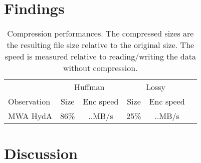 \documentclass{article}
\begin{document}
\section{Findings}

\begin{table}
 \caption{Compression performances. The compressed sizes are the resulting file size relative to the original size. The speed is measured relative to reading/writing the data without compression.}
 \begin{tabular}{|l|c|c|c|c|c|}
  \hline
   & \multicolumn{2}{|c|}{Huffman} & \multicolumn{2}{|c|}{Lossy} \\
  Observation &  \multicolumn{1}{|c}{Size} & \multicolumn{1}{c|}{Enc speed} & \multicolumn{1}{|c}{Size}&\multicolumn{1}{c|}{Enc speed} \\
  \hline
  MWA HydA & 86\% & ..MB/s & 25\% & ..MB/s \\
  \hline
 \end{tabular}

\end{table}


\section{Discussion}


\printbibliography

\label{lastpage}
\end{document}
